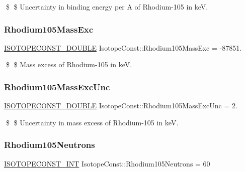 \$ \$ Uncertainty in binding energy per A of Rhodium-\/105 in keV. \mbox{\label{group___isotope_const-_rhodium-_rh105_gaa22d856e2e6f1134afc2fc89408a9829}} 
\subsubsection{\texorpdfstring{Rhodium105\+Mass\+Exc}{Rhodium105MassExc}}
{\footnotesize\ttfamily \mbox{\hyperlink{group___isotope_const-_macros_ga8f45a7272ce02c0b4c65c44636ed719a}{I\+S\+O\+T\+O\+P\+E\+C\+O\+N\+S\+T\+\_\+\+D\+O\+U\+B\+LE}} Isotope\+Const\+::\+Rhodium105\+Mass\+Exc = -\/87851.}

\$ \$ Mass excess of Rhodium-\/105 in keV. \mbox{\label{group___isotope_const-_rhodium-_rh105_ga3b79d40d088efb9bc4b861c58494e478}} 
\subsubsection{\texorpdfstring{Rhodium105\+Mass\+Exc\+Unc}{Rhodium105MassExcUnc}}
{\footnotesize\ttfamily \mbox{\hyperlink{group___isotope_const-_macros_ga8f45a7272ce02c0b4c65c44636ed719a}{I\+S\+O\+T\+O\+P\+E\+C\+O\+N\+S\+T\+\_\+\+D\+O\+U\+B\+LE}} Isotope\+Const\+::\+Rhodium105\+Mass\+Exc\+Unc = 2.}

\$ \$ Uncertainty in mass excess of Rhodium-\/105 in keV. \mbox{\label{group___isotope_const-_rhodium-_rh105_ga2c3063c364426c8781e99438d78cf205}} 
\subsubsection{\texorpdfstring{Rhodium105\+Neutrons}{Rhodium105Neutrons}}
{\footnotesize\ttfamily \mbox{\hyperlink{group___isotope_const-_macros_ga5f18360b3e99483a35c32d789e62621c}{I\+S\+O\+T\+O\+P\+E\+C\+O\+N\+S\+T\+\_\+\+I\+NT}} Isotope\+Const\+::\+Rhodium105\+Neutrons = 60}


